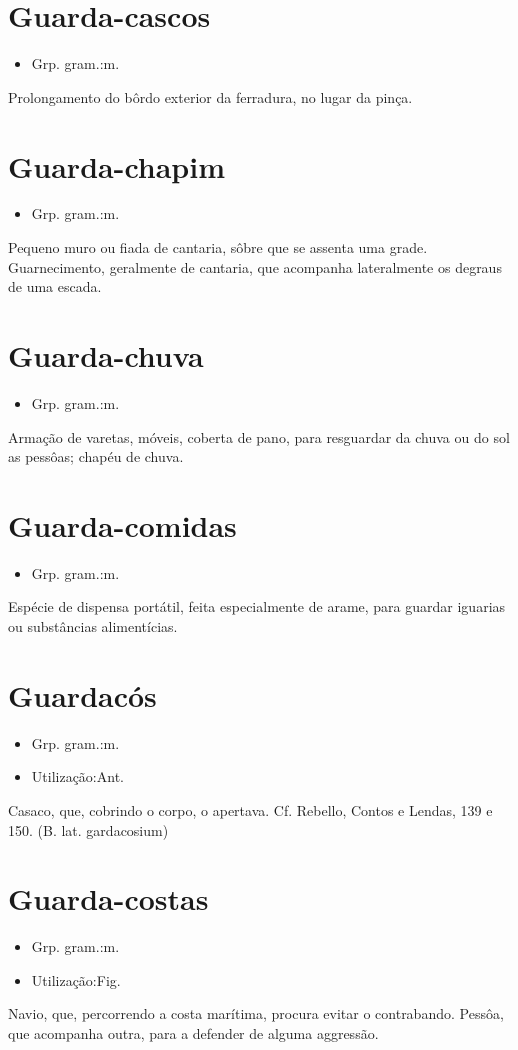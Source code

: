 \section{Guarda-cascos}
\begin{itemize}
\item {Grp. gram.:m.}
\end{itemize}
Prolongamento do bôrdo exterior da ferradura, no lugar da pinça.
\section{Guarda-chapim}
\begin{itemize}
\item {Grp. gram.:m.}
\end{itemize}
Pequeno muro ou fiada de cantaria, sôbre que se assenta uma grade.
Guarnecimento, geralmente de cantaria, que acompanha lateralmente os degraus de uma escada.
\section{Guarda-chuva}
\begin{itemize}
\item {Grp. gram.:m.}
\end{itemize}
Armação de varetas, móveis, coberta de pano, para resguardar da chuva ou do sol as pessôas; chapéu de chuva.
\section{Guarda-comidas}
\begin{itemize}
\item {Grp. gram.:m.}
\end{itemize}
Espécie de dispensa portátil, feita especialmente de arame, para guardar iguarias ou substâncias alimentícias.
\section{Guardacós}
\begin{itemize}
\item {Grp. gram.:m.}
\end{itemize}
\begin{itemize}
\item {Utilização:Ant.}
\end{itemize}
Casaco, que, cobrindo o corpo, o apertava. Cf. Rebello, \textunderscore Contos e Lendas\textunderscore , 139 e 150.
(B. lat. \textunderscore gardacosium\textunderscore )
\section{Guarda-costas}
\begin{itemize}
\item {Grp. gram.:m.}
\end{itemize}
\begin{itemize}
\item {Utilização:Fig.}
\end{itemize}
Navio, que, percorrendo a costa marítima, procura evitar o contrabando.
Pessôa, que acompanha outra, para a defender de alguma aggressão.
